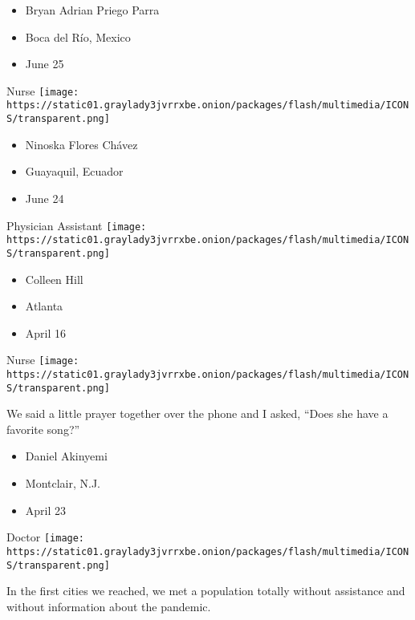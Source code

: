 \begin{itemize}
\tightlist
\item
  Bryan Adrian Priego Parra
\item
  Boca del Río, Mexico
\item
  June 25
\end{itemize}

\protect\hyperlink{item-ninoska-flores-chavez}{}

Nurse
\texttt{[image: https://static01.graylady3jvrrxbe.onion/packages/flash/multimedia/ICONS/transparent.png]}

\begin{itemize}
\tightlist
\item
  Ninoska Flores Chávez 
\item
  Guayaquil, Ecuador
\item
  June 24
\end{itemize}

\protect\hyperlink{item-colleen-hill}{}

Physician Assistant
\texttt{[image: https://static01.graylady3jvrrxbe.onion/packages/flash/multimedia/ICONS/transparent.png]}

\begin{itemize}
\tightlist
\item
  Colleen Hill
\item
  Atlanta
\item
  April 16
\end{itemize}

\protect\hyperlink{item-daniel-akinyemi}{}

Nurse
\texttt{[image: https://static01.graylady3jvrrxbe.onion/packages/flash/multimedia/ICONS/transparent.png]}

We said a little prayer together over the phone and I asked, ``Does she
have a favorite song?''

\begin{itemize}
\tightlist
\item
  Daniel Akinyemi
\item
  Montclair, N.J.
\item
  April 23
\end{itemize}

\protect\hyperlink{item-maite-silva-martins-gadelha}{}

Doctor
\texttt{[image: https://static01.graylady3jvrrxbe.onion/packages/flash/multimedia/ICONS/transparent.png]}

In the first cities we reached, we met a population totally without
assistance and without information about the pandemic.


